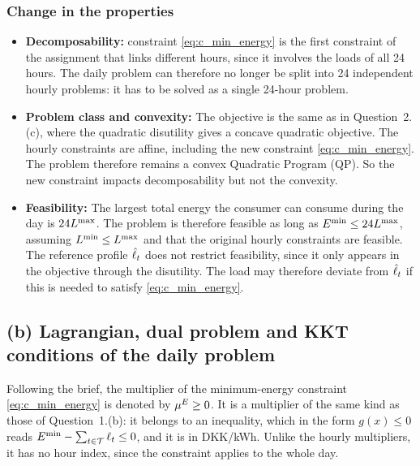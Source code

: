 \subsubsection{Change in the properties}
\begin{itemize}
    \item \textbf{Decomposability:} constraint \eqref{eq:c_min_energy} is the first constraint
    of the assignment that links different hours, since it involves the loads of all 24 hours. The daily problem can therefore no longer be split into 24 independent hourly
    problems: it has to be solved as a single 24-hour problem.
    \item \textbf{Problem class and convexity:}
    The objective is the same as in Question~2.(c), where the quadratic disutility gives a concave quadratic objective. The hourly constraints are affine, including  the new constraint \eqref{eq:c_min_energy}. The problem therefore remains a convex Quadratic Program (QP). So the new constraint impacts decomposability but not the convexity. 

    \item \textbf{Feasibility:}
The largest total energy the consumer can consume during the day is $24L^{\max}$. The problem is therefore feasible as long as $E^{\min} \leq 24L^{\max}$, assuming $L^{\min} \leq L^{\max}$ and that the original hourly constraints are feasible. The reference profile $\hat{\ell}_{t}$ does not restrict feasibility, since it only appears in the objective through the disutility. The load may therefore deviate from $\hat{\ell}_{t}$ if this is needed to satisfy \eqref{eq:c_min_energy}.

\end{itemize}

\subsection{(b) Lagrangian, dual problem and KKT conditions of the daily problem}
Following the brief, the multiplier of the minimum-energy constraint \eqref{eq:c_min_energy}
is denoted by $\mu^{E} \geq 0$. It is a multiplier of the same kind as those of Question~1.(b):
it belongs to an inequality, which in the form $g(x) \leq 0$ reads
$E^{\min} - \sum_{t \in \mathcal{T}} \ell_{t} \leq 0$, and it is in DKK/kWh. Unlike the hourly multipliers, it
has no hour index, since the constraint applies to the whole day.

